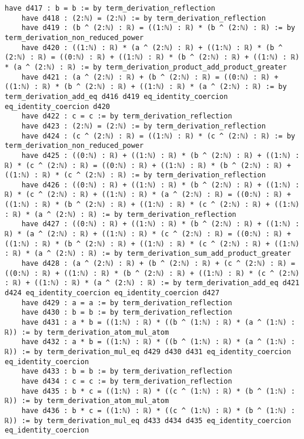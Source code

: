 \documentclass{article}
\begin{document}
\begin{tcolorbox}[colback=white!10, width=\linewidth]
\begin{lstlisting}[language=Lean4]
    have d417 : b = b := by term_derivation_reflection
    have d418 : (2:ℕ) = (2:ℕ) := by term_derivation_reflection
    have d419 : (b ^ (2:ℕ) : ℝ) = ((1:ℕ) : ℝ) * (b ^ (2:ℕ) : ℝ) := by term_derivation_non_reduced_power
    have d420 : ((1:ℕ) : ℝ) * (a ^ (2:ℕ) : ℝ) + ((1:ℕ) : ℝ) * (b ^ (2:ℕ) : ℝ) = ((0:ℕ) : ℝ) + ((1:ℕ) : ℝ) * (b ^ (2:ℕ) : ℝ) + ((1:ℕ) : ℝ) * (a ^ (2:ℕ) : ℝ) := by term_derivation_product_add_product_greater
    have d421 : (a ^ (2:ℕ) : ℝ) + (b ^ (2:ℕ) : ℝ) = ((0:ℕ) : ℝ) + ((1:ℕ) : ℝ) * (b ^ (2:ℕ) : ℝ) + ((1:ℕ) : ℝ) * (a ^ (2:ℕ) : ℝ) := by term_derivation_add_eq d416 d419 eq_identity_coercion eq_identity_coercion d420
    have d422 : c = c := by term_derivation_reflection
    have d423 : (2:ℕ) = (2:ℕ) := by term_derivation_reflection
    have d424 : (c ^ (2:ℕ) : ℝ) = ((1:ℕ) : ℝ) * (c ^ (2:ℕ) : ℝ) := by term_derivation_non_reduced_power
    have d425 : ((0:ℕ) : ℝ) + ((1:ℕ) : ℝ) * (b ^ (2:ℕ) : ℝ) + ((1:ℕ) : ℝ) * (c ^ (2:ℕ) : ℝ) = ((0:ℕ) : ℝ) + ((1:ℕ) : ℝ) * (b ^ (2:ℕ) : ℝ) + ((1:ℕ) : ℝ) * (c ^ (2:ℕ) : ℝ) := by term_derivation_reflection
    have d426 : ((0:ℕ) : ℝ) + ((1:ℕ) : ℝ) * (b ^ (2:ℕ) : ℝ) + ((1:ℕ) : ℝ) * (c ^ (2:ℕ) : ℝ) + ((1:ℕ) : ℝ) * (a ^ (2:ℕ) : ℝ) = ((0:ℕ) : ℝ) + ((1:ℕ) : ℝ) * (b ^ (2:ℕ) : ℝ) + ((1:ℕ) : ℝ) * (c ^ (2:ℕ) : ℝ) + ((1:ℕ) : ℝ) * (a ^ (2:ℕ) : ℝ) := by term_derivation_reflection
    have d427 : ((0:ℕ) : ℝ) + ((1:ℕ) : ℝ) * (b ^ (2:ℕ) : ℝ) + ((1:ℕ) : ℝ) * (a ^ (2:ℕ) : ℝ) + ((1:ℕ) : ℝ) * (c ^ (2:ℕ) : ℝ) = ((0:ℕ) : ℝ) + ((1:ℕ) : ℝ) * (b ^ (2:ℕ) : ℝ) + ((1:ℕ) : ℝ) * (c ^ (2:ℕ) : ℝ) + ((1:ℕ) : ℝ) * (a ^ (2:ℕ) : ℝ) := by term_derivation_sum_add_product_greater
    have d428 : (a ^ (2:ℕ) : ℝ) + (b ^ (2:ℕ) : ℝ) + (c ^ (2:ℕ) : ℝ) = ((0:ℕ) : ℝ) + ((1:ℕ) : ℝ) * (b ^ (2:ℕ) : ℝ) + ((1:ℕ) : ℝ) * (c ^ (2:ℕ) : ℝ) + ((1:ℕ) : ℝ) * (a ^ (2:ℕ) : ℝ) := by term_derivation_add_eq d421 d424 eq_identity_coercion eq_identity_coercion d427
    have d429 : a = a := by term_derivation_reflection
    have d430 : b = b := by term_derivation_reflection
    have d431 : a * b = ((1:ℕ) : ℝ) * ((b ^ (1:ℕ) : ℝ) * (a ^ (1:ℕ) : ℝ)) := by term_derivation_atom_mul_atom
    have d432 : a * b = ((1:ℕ) : ℝ) * ((b ^ (1:ℕ) : ℝ) * (a ^ (1:ℕ) : ℝ)) := by term_derivation_mul_eq d429 d430 d431 eq_identity_coercion eq_identity_coercion
    have d433 : b = b := by term_derivation_reflection
    have d434 : c = c := by term_derivation_reflection
    have d435 : b * c = ((1:ℕ) : ℝ) * ((c ^ (1:ℕ) : ℝ) * (b ^ (1:ℕ) : ℝ)) := by term_derivation_atom_mul_atom
    have d436 : b * c = ((1:ℕ) : ℝ) * ((c ^ (1:ℕ) : ℝ) * (b ^ (1:ℕ) : ℝ)) := by term_derivation_mul_eq d433 d434 d435 eq_identity_coercion eq_identity_coercion

\end{lstlisting}
\end{tcolorbox}
\end{document}
